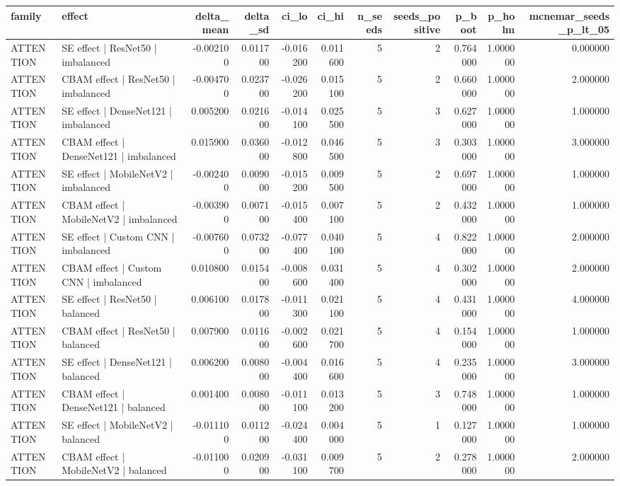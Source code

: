 \begin{tabular}{llrrrrrrrrr}
\toprule
family & effect & delta\_mean & delta\_sd & ci\_lo & ci\_hi & n\_seeds & seeds\_positive & p\_boot & p\_holm & mcnemar\_seeds\_p\_lt\_05 \\
\midrule
ATTENTION & SE effect | ResNet50 | imbalanced & -0.002100 & 0.011700 & -0.016200 & 0.011600 & 5 & 2 & 0.764000 & 1.000000 & 0.000000 \\
ATTENTION & CBAM effect | ResNet50 | imbalanced & -0.004700 & 0.023700 & -0.026200 & 0.015100 & 5 & 2 & 0.660000 & 1.000000 & 2.000000 \\
ATTENTION & SE effect | DenseNet121 | imbalanced & 0.005200 & 0.021600 & -0.014100 & 0.025500 & 5 & 3 & 0.627000 & 1.000000 & 1.000000 \\
ATTENTION & CBAM effect | DenseNet121 | imbalanced & 0.015900 & 0.036000 & -0.012800 & 0.046500 & 5 & 3 & 0.303000 & 1.000000 & 3.000000 \\
ATTENTION & SE effect | MobileNetV2 | imbalanced & -0.002400 & 0.009000 & -0.015200 & 0.009500 & 5 & 2 & 0.697000 & 1.000000 & 1.000000 \\
ATTENTION & CBAM effect | MobileNetV2 | imbalanced & -0.003900 & 0.007100 & -0.015400 & 0.007100 & 5 & 2 & 0.432000 & 1.000000 & 1.000000 \\
ATTENTION & SE effect | Custom CNN | imbalanced & -0.007600 & 0.073200 & -0.077400 & 0.040100 & 5 & 4 & 0.822000 & 1.000000 & 2.000000 \\
ATTENTION & CBAM effect | Custom CNN | imbalanced & 0.010800 & 0.015400 & -0.008600 & 0.031400 & 5 & 4 & 0.302000 & 1.000000 & 2.000000 \\
ATTENTION & SE effect | ResNet50 | balanced & 0.006100 & 0.017800 & -0.011300 & 0.021100 & 5 & 4 & 0.431000 & 1.000000 & 4.000000 \\
ATTENTION & CBAM effect | ResNet50 | balanced & 0.007900 & 0.011600 & -0.002600 & 0.021700 & 5 & 4 & 0.154000 & 1.000000 & 1.000000 \\
ATTENTION & SE effect | DenseNet121 | balanced & 0.006200 & 0.008000 & -0.004400 & 0.016600 & 5 & 4 & 0.235000 & 1.000000 & 3.000000 \\
ATTENTION & CBAM effect | DenseNet121 | balanced & 0.001400 & 0.008000 & -0.011100 & 0.013200 & 5 & 3 & 0.748000 & 1.000000 & 1.000000 \\
ATTENTION & SE effect | MobileNetV2 | balanced & -0.011100 & 0.011200 & -0.024400 & 0.004000 & 5 & 1 & 0.127000 & 1.000000 & 1.000000 \\
ATTENTION & CBAM effect | MobileNetV2 | balanced & -0.011000 & 0.020900 & -0.031100 & 0.009700 & 5 & 2 & 0.278000 & 1.000000 & 2.000000 \\

\end{tabular}
